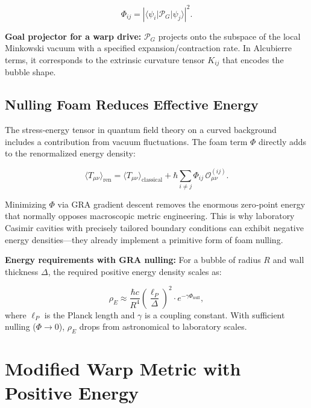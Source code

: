 \documentclass[11pt]{article}
\begin{document}
\begin{equation}
\Phi_{ij} = \left| \langle \psi_i | \mathcal{P}_G | \psi_j \rangle \right|^2.
\label{eq:foam_cell}
\end{equation}

\textbf{Goal projector for a warp drive:} $\mathcal{P}_G$ projects onto the subspace of the local Minkowski vacuum with a specified expansion/contraction rate. In Alcubierre terms, it corresponds to the extrinsic curvature tensor $K_{ij}$ that encodes the bubble shape.

\subsection{Nulling Foam Reduces Effective Energy}

The stress‑energy tensor in quantum field theory on a curved background includes a contribution from vacuum fluctuations. The foam term $\Phi$ directly adds to the renormalized energy density:

\begin{equation}
\langle T_{\mu\nu} \rangle_{\text{ren}} = \langle T_{\mu\nu} \rangle_{\text{classical}} + \hbar \sum_{i \neq j} \Phi_{ij} \, \mathcal{O}_{\mu\nu}^{(ij)}.
\label{eq:renormalized_energy}
\end{equation}

Minimizing $\Phi$ via GRA gradient descent removes the enormous zero‑point energy that normally opposes macroscopic metric engineering. This is why laboratory Casimir cavities with precisely tailored boundary conditions can exhibit negative energy densities—they already implement a primitive form of foam nulling.

\textbf{Energy requirements with GRA nulling:} For a bubble of radius $R$ and wall thickness $\Delta$, the required positive energy density scales as:

\begin{equation}
\rho_E \approx \frac{\hbar c}{R^4} \left( \frac{\ell_P}{\Delta} \right)^2 \cdot e^{-\gamma \Phi_{\text{null}}},
\label{eq:energy_scaling}
\end{equation}
where $\ell_P$ is the Planck length and $\gamma$ is a coupling constant. With sufficient nulling ($\Phi \to 0$), $\rho_E$ drops from astronomical to laboratory scales.

\section{Modified Warp Metric with Positive Energy}
\end{document}
